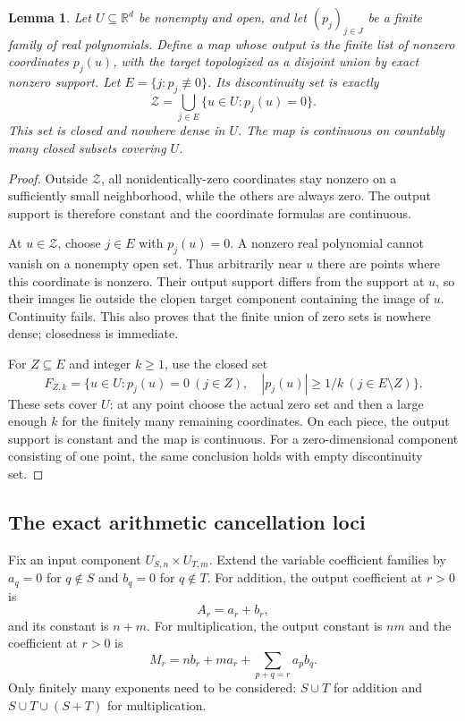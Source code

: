 \documentclass[11pt]{article}
\numberwithin{equation}{section}
\newtheorem{lemma}[lemma]{Lemma}
\theoremstyle{definition}
\theoremstyle{remark}
\newcommand{\R}{\mathbb R}
\begin{document}
\begin{lemma}
\label{pma:bor:lem:polynormalize}
Let $U\subseteq\R^d$ be nonempty and open, and let
$(p_j)_{j\in J}$ be a finite family of real polynomials. Define a map whose
output is the finite list of nonzero coordinates $p_j(u)$, with the target
topologized as a disjoint union by exact nonzero support. Let
$E=\{j:p_j\not\equiv0\}$. Its discontinuity set is exactly
\[
 \mathcal Z=\bigcup_{j\in E}\{u\in U:p_j(u)=0\}.
\]
This set is closed and nowhere dense in $U$. The map is continuous on
countably many closed subsets covering $U$.
\end{lemma}
\begin{proof}
Outside $\mathcal Z$, all nonidentically-zero coordinates stay nonzero on a sufficiently
small neighborhood, while the others are always zero. The output support is
therefore constant and the coordinate formulas are continuous.

At $u\in \mathcal Z$, choose $j\in E$ with $p_j(u)=0$. A nonzero real polynomial
cannot vanish on a nonempty open set. Thus arbitrarily near $u$ there are
points where this coordinate is nonzero. Their output support differs from
the support at $u$, so their images lie outside the clopen target component
containing the image of $u$. Continuity fails. This also proves that the
finite union of zero sets is nowhere dense; closedness is immediate.

For $Z\subseteq E$ and integer $k\geq1$, use the closed set
\begin{equation}
\label{pma:bor:eq:closedpieces}
 F_{Z,k}=\{u\in U:p_j(u)=0\ (j\in Z),\quad
                        |p_j(u)|\geq1/k\ (j\in E\setminus Z)\}.
\end{equation}
These sets cover $U$: at any point choose the actual zero set and then a
large enough $k$ for the finitely many remaining coordinates. On each piece,
the output support is constant and the map is continuous.
For a zero-dimensional component consisting of one point, the same conclusion
holds with empty discontinuity set.
\end{proof}

\subsection{The exact arithmetic cancellation loci}

Fix an input component $U_{S,n}\times U_{T,m}$. Extend the variable coefficient
families by $a_q=0$ for $q\notin S$ and $b_q=0$ for $q\notin T$.
For addition, the output coefficient at $r>0$ is
\begin{equation}
\label{pma:bor:eq:pluscoeff}
 A_r=a_r+b_r,
\end{equation}
and its constant is $n+m$. For multiplication, the output constant is $nm$
and the coefficient at $r>0$ is
\begin{equation}
\label{pma:bor:eq:timescoeff}
 M_r=n b_r+m a_r+\sum_{p+q=r}a_p b_q.
\end{equation}
Only finitely many exponents need to be considered:
$S\cup T$ for addition and $S\cup T\cup(S+T)$ for multiplication.
\end{document}
